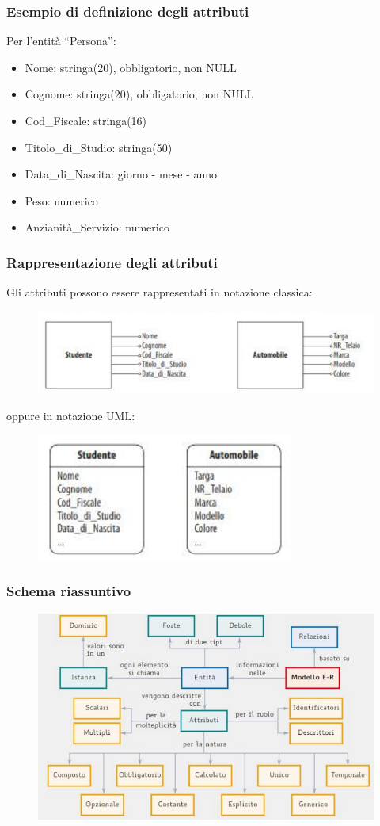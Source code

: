 \documentclass[]{beamer}
\begin{document}
\begin{frame}
\frametitle{Esempio di definizione degli attributi}
Per l'entità ``Persona'':
\begin{itemize}
  \item Nome: stringa(20), obbligatorio, non NULL
  \item Cognome: stringa(20), obbligatorio, non NULL
  \item Cod\_Fiscale: stringa(16)
  \item Titolo\_di\_Studio: stringa(50)
  \item Data\_di\_Nascita: giorno - mese - anno
  \item Peso: numerico
  \item Anzianità\_Servizio: numerico
\end{itemize}
\end{frame}

\begin{frame}
\frametitle{Rappresentazione degli attributi}
Gli attributi possono essere rappresentati in \alert<1>{notazione classica}:
\begin{figure}
  \includegraphics[width=.8\columnwidth]{img/attributistd.png}
\end{figure}
oppure in \alert<1>{notazione UML}:
\begin{figure}
  \includegraphics[width=.5\columnwidth]{img/attributiuml.png}
\end{figure}
\end{frame}


\begin{frame}
\frametitle{Schema riassuntivo}
\begin{figure}
  \includegraphics[width=\columnwidth]{img/schemaattributi.png}
\end{figure}
\end{frame}
\end{document}
